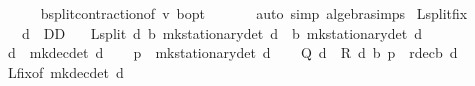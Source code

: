 \begin{isabellebody}
\ \ \ \ \isamarkupfalse%
\ {\isasymL}\isactrlsub b{\isacharunderscore}{\kern0pt}split{\isacharunderscore}{\kern0pt}contraction{\isacharbrackleft}{\kern0pt}of\ v\ {\isasymnu}\isactrlsub b{\isacharunderscore}{\kern0pt}opt{\isacharbrackright}{\kern0pt}\ \isanewline
\ \ \ \ \isamarkupfalse%
\ {\isacharparenleft}{\kern0pt}auto\ simp{\isacharcolon}{\kern0pt}\ algebra{\isacharunderscore}{\kern0pt}simps{\isacharparenright}{\kern0pt}\isanewline
{}\isamarkupfalse%
%
\endisatagproof
{\isafoldproof}%
%
\isadelimproof
\isanewline
%
\endisadelimproof
\isanewline
{}\isamarkupfalse%
\ L{\isacharunderscore}{\kern0pt}split{\isacharunderscore}{\kern0pt}fix{\isacharcolon}{\kern0pt}\isanewline
\ \ \ {\isachardoublequoteopen}d\ {\isasymin}\ D\isactrlsub D{\isachardoublequoteclose}\isanewline
\ \ \ {\isachardoublequoteopen}L{\isacharunderscore}{\kern0pt}split\ d\ {\isacharparenleft}{\kern0pt}{\isasymnu}\isactrlsub b\ {\isacharparenleft}{\kern0pt}mk{\isacharunderscore}{\kern0pt}stationary{\isacharunderscore}{\kern0pt}det\ d{\isacharparenright}{\kern0pt}{\isacharparenright}{\kern0pt}\ {\isacharequal}{\kern0pt}\ {\isasymnu}\isactrlsub b\ {\isacharparenleft}{\kern0pt}mk{\isacharunderscore}{\kern0pt}stationary{\isacharunderscore}{\kern0pt}det\ d{\isacharparenright}{\kern0pt}{\isachardoublequoteclose}\isanewline
%
\isadelimproof
%
\endisadelimproof
%
\isatagproof
{}\isamarkupfalse%
\ {\isacharminus}{\kern0pt}\isanewline
\ \ \isamarkupfalse%
\ {\isacharquery}{\kern0pt}d\ {\isacharequal}{\kern0pt}\ {\isachardoublequoteopen}mk{\isacharunderscore}{\kern0pt}dec{\isacharunderscore}{\kern0pt}det\ d{\isachardoublequoteclose}\isanewline
\ \ \isamarkupfalse%
\ {\isacharquery}{\kern0pt}p\ {\isacharequal}{\kern0pt}\ {\isachardoublequoteopen}mk{\isacharunderscore}{\kern0pt}stationary{\isacharunderscore}{\kern0pt}det\ d{\isachardoublequoteclose}\isanewline
\ \ \isamarkupfalse%
\ {\isachardoublequoteopen}{\isacharparenleft}{\kern0pt}Q\ d\ {\isacharminus}{\kern0pt}\ R\ d{\isacharparenright}{\kern0pt}\ {\isacharparenleft}{\kern0pt}{\isasymnu}\isactrlsub b\ {\isacharquery}{\kern0pt}p{\isacharparenright}{\kern0pt}\ {\isacharequal}{\kern0pt}\ r{\isacharunderscore}{\kern0pt}dec\isactrlsub b\ {\isacharquery}{\kern0pt}d{\isachardoublequoteclose}\isanewline
\ \ \ \ \isamarkupfalse%
\ L{\isacharunderscore}{\kern0pt}{\isasymnu}{\isacharunderscore}{\kern0pt}fix{\isacharbrackleft}{\kern0pt}of\ {\isachardoublequoteopen}mk{\isacharunderscore}{\kern0pt}dec{\isacharunderscore}{\kern0pt}det\ d{\isachardoublequoteclose}{\isacharbrackright}{\kern0pt}\isanewline

\end{isabellebody}
